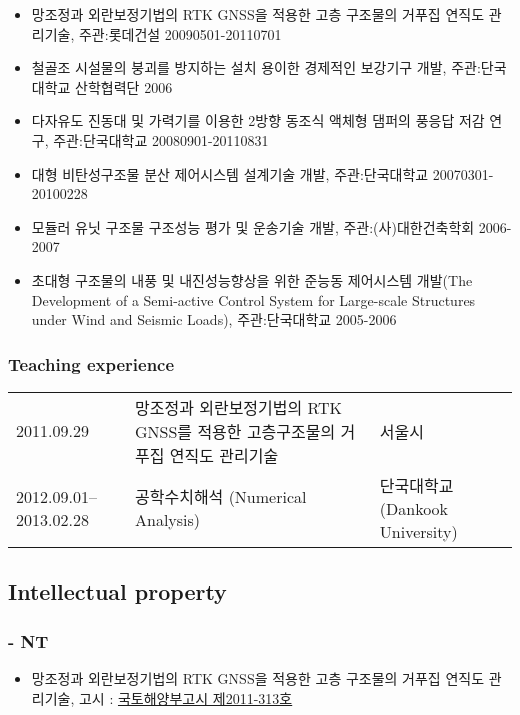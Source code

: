 \begin{itemize}
\item 망조정과 외란보정기법의 RTK GNSS을 적용한 고층 구조물의 거푸집 연직도 관리기술, 주관:롯데건설 \hfill 20090501-20110701
\item 철골조 시설물의 붕괴를 방지하는 설치 용이한 경제적인 보강기구 개발, 주관:단국대학교 산학협력단 \hfill2006
\item 다자유도 진동대 및 가력기를 이용한 2방향 동조식 액체형 댐퍼의 풍응답 저감 연구, 주관:단국대학교 \hfill20080901-20110831
\item 대형 비탄성구조물 분산 제어시스템 설계기술 개발, 주관:단국대학교 \hfill20070301-20100228
\item 모듈러 유닛 구조물 구조성능 평가 및 운송기술 개발, 주관:(사)대한건축학회 \hfill2006-2007
\item 초대형 구조물의 내풍 및 내진성능향상을 위한 준능동 제어시스템 개발(The Development of a Semi-active Control System for Large-scale Structures under Wind and Seismic Loads), 주관:단국대학교 \hfill2005-2006
\end{itemize}

\subsubsection*{Teaching experience}

\begin{tabularx}{\textwidth}{p{}XX}
    2011.09.29 & 망조정과 외란보정기법의 RTK GNSS를 적용한 고층구조물의 거푸집 연직도 관리기술 & 서울시 \\
    2012.09.01--2013.02.28 & 공학수치해석 (Numerical Analysis) & 단국대학교 (Dankook University)\\
\end{tabularx}

\subsection*{Intellectual property}

\subsubsection*{ - NT}
\begin{itemize}
\item 망조정과 외란보정기법의 RTK GNSS을 적용한 고층 구조물의 거푸집 연직도 관리기술, 고시 : \href{http://www.kaia.re.kr/portal/newtec/view.do?searchCnd=1\&searchWrd=\&menuNo=200075\&frApntYear=\&toApntYear=\&pageUnit=10\&frApntNo=\&toApntNo=\&cate1=\&cate2=\&cate3=\&tecCat1=\&tecCat2=\&tecCat3=\&newtecCat1=\&newtecCat2=\&newtecCat3=\&dvlprNm=\%ED\%95\%9C\%EA\%B5\%AD\%EC\%9C\%A0\%EC\%A7\%80\%EA\%B4\%80\%EB\%A6\%AC\&ordDvs=\&pageIndex=1\&apntNo=625\&frMenu=list}{국토해양부고시
  제2011-313호} 
\end{itemize}


